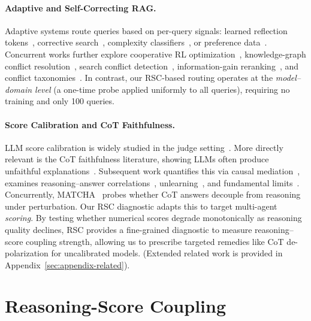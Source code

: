 \documentclass[11pt]{article}
\theoremstyle{definition}
\begin{document}
\paragraph{Adaptive and Self-Correcting RAG.}
Adaptive systems route queries based on per-query signals: learned reflection tokens~\citep{asai2024self}, corrective search~\citep{yan2024corrective}, complexity classifiers~\citep{jeong2024adaptive}, or preference data~\citep{ong2024routellm}. Concurrent works further explore cooperative RL optimization~\citep{chen2025improving}, knowledge-graph conflict resolution~\citep{liu2025truthfulrag}, search conflict detection~\citep{cattan2025dragged}, information-gain reranking~\citep{wang2025infogain}, and conflict taxonomies~\citep{xu2024knowledge}. In contrast, our RSC-based routing operates at the \emph{model--domain level} (a one-time probe applied uniformly to all queries), requiring no training and only 100 queries.

\paragraph{Score Calibration and CoT Faithfulness.}
LLM score calibration is widely studied in the judge setting~\citep{jung2024trust, jain2025beyond, li2025cot, pitre2025consensagent, li2025generation}. More directly relevant is the CoT faithfulness literature, showing LLMs often produce unfaithful explanations~\citep{turpin2023language, lanham2023measuring}. Subsequent work quantifies this via causal mediation~\citep{paul2024making}, examines reasoning--answer correlations~\citep{jiang2025makes}, unlearning~\citep{tutek2025measuring}, and fundamental limits~\citep{lyu2023faithful, tanneru2024hardness}. Concurrently, MATCHA~\citep{jiang2025robust} probes whether CoT answers decouple from reasoning under perturbation. Our RSC diagnostic adapts this to target multi-agent \emph{scoring}. By testing whether numerical scores degrade monotonically as reasoning quality declines, RSC provides a fine-grained diagnostic to measure reasoning--score coupling strength, allowing us to prescribe targeted remedies like CoT de-polarization for uncalibrated models. (Extended related work is provided in Appendix~\ref{sec:appendix-related}).


\section{Reasoning-Score Coupling}
\label{sec:rsc}
\end{document}
